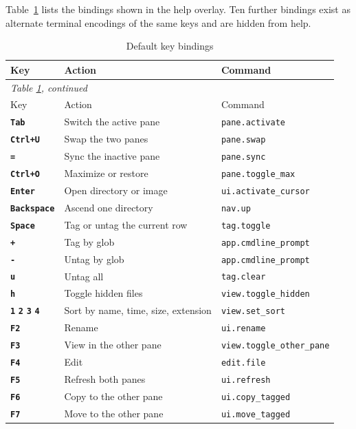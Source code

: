 \documentclass[tm]{ornltm}
\newcommand{\key}[1]{\textbf{\texttt{#1}}}
\begin{document}
Table~\ref{tab:allkeys} lists the bindings shown in the help overlay. Ten further
bindings exist as alternate terminal encodings of the same keys and are hidden
from help.

\begin{small}
\begin{longtable}{p{} p{} p{}}
  \caption{Default key bindings}
  \label{tab:allkeys} \\
  \toprule
  Key & Action & Command \\
  \midrule
  \endfirsthead
  \multicolumn{3}{l}{\emph{Table \ref{tab:allkeys}, continued}} \\
  \toprule
  Key & Action & Command \\
  \midrule
  \endhead
  \bottomrule
  \endfoot
  \key{Tab} & Switch the active pane & \texttt{pane.activate} \\
  \key{Ctrl+U} & Swap the two panes & \texttt{pane.swap} \\
  \key{=} & Sync the inactive pane & \texttt{pane.sync} \\
  \key{Ctrl+O} & Maximize or restore & \texttt{pane.toggle\_max} \\
  \key{Enter} & Open directory or image & \texttt{ui.activate\_cursor} \\
  \key{Backspace} & Ascend one directory & \texttt{nav.up} \\
  \key{Space} & Tag or untag the current row & \texttt{tag.toggle} \\
  \key{+} & Tag by glob & \texttt{app.cmdline\_prompt} \\
  \key{-} & Untag by glob & \texttt{app.cmdline\_prompt} \\
  \key{u} & Untag all & \texttt{tag.clear} \\
  \key{h} & Toggle hidden files & \texttt{view.toggle\_hidden} \\
  \key{1} \key{2} \key{3} \key{4} & Sort by name, time, size, extension &
    \texttt{view.set\_sort} \\
  \key{F2} & Rename & \texttt{ui.rename} \\
  \key{F3} & View in the other pane & \texttt{view.toggle\_other\_pane} \\
  \key{F4} & Edit & \texttt{edit.file} \\
  \key{F5} & Refresh both panes & \texttt{ui.refresh} \\
  \key{F6} & Copy to the other pane & \texttt{ui.copy\_tagged} \\
  \key{F7} & Move to the other pane & \texttt{ui.move\_tagged} \\

\end{longtable}
\end{small}
\end{document}
